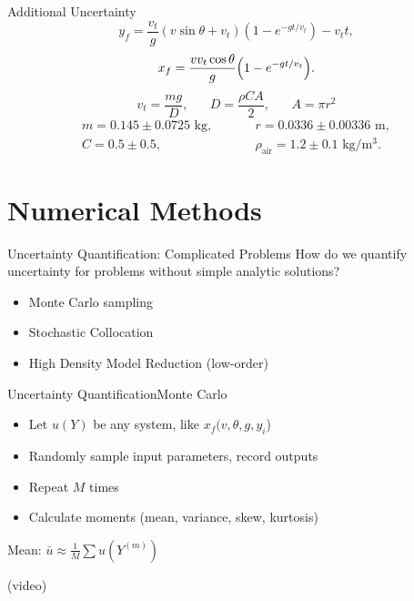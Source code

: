 \documentclass{beamer}
\begin{document}
\begin{frame}{Additional Uncertainty}
\begin{equation}
y_f=\frac{v_t}{g}(v\sin\theta+v_t)\left(1-e^{-gt/v_t}\right)-v_tt,
\end{equation}
\begin{equation}
x_f=\frac{vv_t\cos\theta}{g}\qty(1-e^{-gt/v_t}).
\end{equation}
\begin{equation}
v_t=\frac{mg}{D},\hspace{20pt}D=\frac{\rho C A}{2},\hspace{20pt}A=\pi r^2
\end{equation}
\begin{align}
m=0.145\pm0.0725\text{ kg},\hspace{30pt}&r=0.0336\pm0.00336\text{ m},\\
C=0.5\pm0.5,\hspace{35pt}&\rho_\text{air}=1.2\pm0.1\text{ kg/m$^3$}.
\end{align}
\end{frame}

\section{Numerical Methods}
\begin{frame}{Uncertainty Quantification: Complicated Problems}\vspace{-20pt}
How do we quantify uncertainty for problems without simple analytic solutions?\vspace{15pt}
\begin{itemize}
\item Monte Carlo sampling
\item Stochastic Collocation
\item High Density Model Reduction (low-order)
\end{itemize}
\end{frame}

\begin{frame}{Uncertainty Quantification}{Monte Carlo}\vspace{-30pt}
\begin{itemize}
\item Let $u(Y)$ be any system, like $x_f(v,\theta,g,y_i$)
\item Randomly sample input parameters, record outputs
\item Repeat $M$ times
\item Calculate moments (mean, variance, skew, kurtosis)
\end{itemize}
\centerline{Mean: $\bar u\approx\frac{1}{M}\sum u\left(Y^{(m)}\right)$}
(video)
\end{frame}
\end{document}
